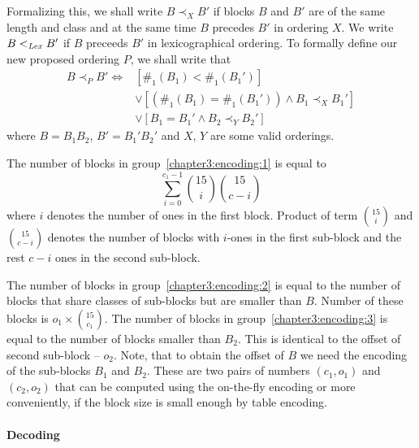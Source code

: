 Formalizing this, we shall write $B\prec_X B'$ if blocks $B$ and $B'$ are of
the same length and class and at the same time $B$ precedes $B'$ in ordering $X$.
We write $B<_{\mathit{Lex}} B'$ if $B$ preceeds $B'$ in lexicographical
ordering. To formally define our new proposed ordering $P$, we shall write that
\begin{align*}
    B\prec_P B' \iff
    &[\#_1(B_1) < \#_1(B_1')] \\
    &\lor [(\#_1(B_1) = \#_1(B_1')) \land B_1 \prec_{X} B_1']\\
    &\lor [B_1 = B_1' \land B_2 \prec_{Y} B_2']
\end{align*}
where $B=B_1B_2$, $B'=B_1'B_2'$ and $X$, $Y$ are some valid orderings.

The number of blocks in group~\ref{chapter3:encoding:1} is equal to
$$\sum_{i=0}^{c_1-1} {15\choose i} {15\choose c-i}$$ where $i$ denotes the number
of ones in the first block. Product of term ${15\choose i}$ and ${15\choose c-i}$
denotes the number of blocks with $i$-ones in the first sub-block and the rest
$c-i$ ones in the second sub-block.

The number of blocks in group~\ref{chapter3:encoding:2} is equal to the number of blocks that
share classes of sub-blocks but are smaller than $B$. Number of these blocks is $o_1\times {15\choose c_1}$.
The number of blocks in group~\ref{chapter3:encoding:3} is equal to the number of blocks smaller 
than $B_2$. This is identical to the offset of second sub-block -- $o_2$. Note, that to obtain the
offset of $B$ we need the encoding of the sub-blocks $B_1$ and $B_2$. These are two pairs of numbers
$(c_1, o_1)$ and $(c_2, o_2)$ that can be computed using the on-the-fly encoding or more conveniently,
if the block size is small enough by table encoding.

\paragraph{Decoding}

